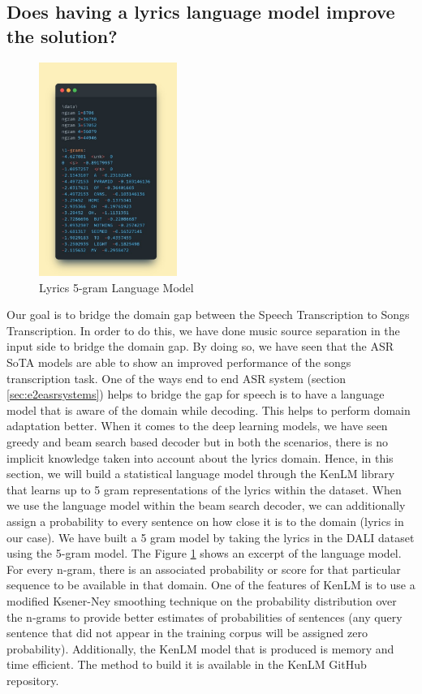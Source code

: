 \subsection{Does having a lyrics language model improve the solution?}



\begin{figure}
    \centering
    \includegraphics[width=0.4\textwidth]{05-research study/figures/lyricslanguagemodel.pdf}
    \caption{Lyrics 5-gram Language Model}
    \label{fig:lyricslanguagemodel}
\end{figure}


Our goal is to bridge the domain gap between the Speech Transcription to Songs Transcription. In order to do this, we have done music source separation in the input side to bridge the domain gap. By doing so, we have seen that the ASR SoTA models are able to show an improved performance of the songs transcription task. One of the ways end to end ASR system (section \ref{sec:e2easrsystems}) helps to bridge the gap for speech is to have a language model that is aware of the domain while decoding. This helps to perform domain adaptation better. When it comes to the deep learning models, we have seen greedy and beam search based decoder but in both the scenarios, there is no implicit knowledge taken into account about the lyrics domain. Hence, in this section, we will build a statistical language model through the KenLM library \cite{heafield-etal-2013-scalable} that learns up to 5 gram representations of the lyrics within the dataset. When we use the language model within the beam search decoder, we can additionally assign a probability to every sentence on how close it is to the domain (lyrics in our case). We have built a 5 gram model by taking the lyrics in the DALI dataset using the 5-gram model. The Figure \ref{fig:lyricslanguagemodel} shows an excerpt of the language model. For every n-gram, there is an associated probability or score for that particular sequence to be available in that domain. One of the features of KenLM is to use a modified Ksener-Ney smoothing technique on the probability distribution over the n-grams to provide better estimates of probabilities of sentences (any query sentence that did not appear in the training corpus will be assigned zero probability). Additionally, the KenLM model that is produced is memory and time efficient. The method to build it is available in the KenLM GitHub repository.

